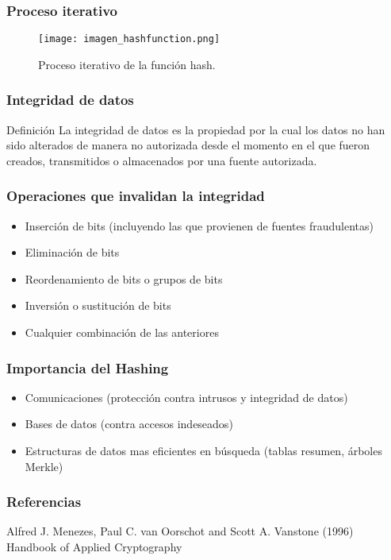 \documentclass{beamer}
\begin{document}

\begin{frame}
\frametitle{Proceso iterativo}
\begin{figure}
\texttt{[image: imagen\_hashfunction.png]}
\caption{Proceso iterativo de la función hash.}
\end{figure}
\end{frame}


\begin{frame}
\frametitle{Integridad de datos}
\begin{block}{Definición}
  La integridad de datos es la propiedad por la cual los datos no
  han sido alterados de manera no autorizada desde el momento en el que
  fueron creados, transmitidos o almacenados por una fuente autorizada.
\end{block}
\end{frame}


\begin{frame}
\frametitle{Operaciones que invalidan la integridad}
\begin{itemize}
\item Inserción de bits (incluyendo las que provienen de fuentes fraudulentas)
\item Eliminación de bits
\item Reordenamiento de bits o grupos de bits
\item Inversión o sustitución de bits
\item Cualquier combinación de las anteriores
\end{itemize}
\end{frame}


\begin{frame}
\frametitle{Importancia del Hashing}
\begin{itemize}
\item Comunicaciones (protección contra intrusos y integridad de datos)
\item Bases de datos (contra accesos indeseados)
\item Estructuras de datos mas eficientes en búsqueda (tablas resumen, árboles Merkle)
\end{itemize}
\end{frame}


\begin{frame}
\frametitle{Referencias}
\footnotesize{
\begin{thebibliography}{99} %
 Alfred J. Menezes, Paul C. van Oorschot and Scott A. Vanstone (1996)
\newblock Handbook of Applied Cryptography
\end{thebibliography}
}
\end{frame}

\end{document}
